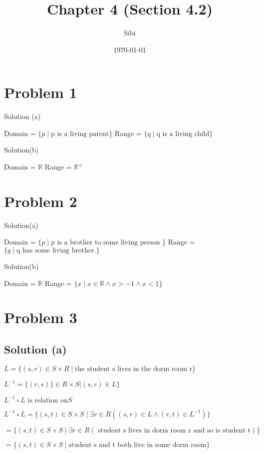 \documentclass{article}
\begin{document}
\title{Chapter 4 (Section 4.2)}
\author{Sibi}
\date{\today}
\maketitle
\newpage

\section{Problem 1}
Solution (a)

Domain = $\{ p \mid \text{p is a living parent} \}$
Range = $\{ q \mid \text{q is a living child} \}$

Solution(b)

Domain = $\mathbb{R}$
Range = $\mathbb{R^+}$

\section{Problem 2}

Solution(a)

Domain = $\{ p \mid \text{p is a brother to some living person }\}$
Range = $\{q \mid \text{q has some living brother.}\}$

Solution(b)

Domain = $\mathbb{R}$
Range = $\{ x \mid x \in \mathbb{R} \land  x > -1 \land x < 1 \}$

\section{Problem 3}

\subsection{Solution (a)}
\noindent

$L = \{(s,r) \in S \times R \mid \text{the student s lives in the dorm room
  r}\}$

$L^{-1} = \{(r,s)\} \in R \times S | (s,r) \in L\}$

$L^{-1} \circ L \text{ is relation on} S$

$L^{-1} \circ L = \{(s,t) \in S \times S \mid \exists r \in R((s,r) \in L \land
(r,t) \in L^{-1})\}$

$ = \{(s,t) \in S \times S \mid \exists r \in R (\text{ student s lives in
  dorm room r and so is student t})\}$

$ = \{(s,t) \in S \times S \mid \text{student s and t both live in some dorm
  room} \}$
\end{document}
